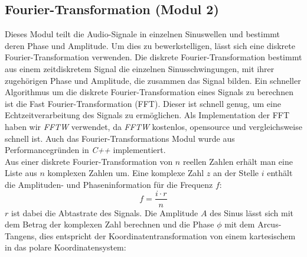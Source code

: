   \subsection{Fourier-Transformation (Modul 2)}
  Dieses Modul teilt die Audio-Signale in einzelnen Sinuswellen und bestimmt deren Phase und Amplitude. Um dies zu bewerkstelligen, lässt sich eine diskrete Fourier-Transformation verwenden. Die diskrete Fourier-Transformation bestimmt aus einem zeitdiskretem Signal die einzelnen Sinusschwingungen, mit ihrer zugehörigen Phase und Amplitude, die zusammen das Signal bilden. Ein schneller Algorithmus um die diskrete Fourier-Transformation eines Signals zu berechnen ist die Fast Fourier-Transformation (FFT). Dieser ist schnell genug, um eine Echtzeitverarbeitung des Signals zu ermöglichen. Als Implementation der FFT haben wir \textit{FFTW}\cite{FFTW} verwendet, da \textit{FFTW} kostenlos, opensource und vergleichsweise schnell ist.
  Auch das Fourier-Transformations Modul wurde aus Performancegründen in \textit{C++} implementiert.\\ 
  Aus einer diskrete Fourier-Transformation von $n$ reellen Zahlen erhält man eine Liste aus $n$ komplexen Zahlen um. Eine komplexe Zahl $z$ an der Stelle $i$ enthält die Amplituden- und Phaseninformation für die Frequenz $f$:
  $$
  f = \frac{i\cdot r}{n}
  $$
  $r$ ist dabei die Abtastrate des Signals. Die Amplitude $A$ des Sinus lässt sich mit dem Betrag der komplexen Zahl berechnen und die Phase $\phi$ mit dem Arcus-Tangens, dies entspricht der Koordinatentransformation von einem kartesischem in das polare Koordinatensystem:

